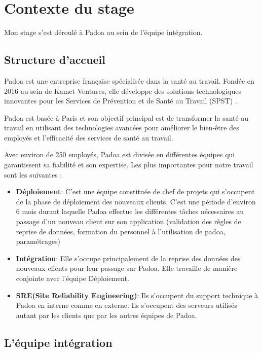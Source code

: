 \section{Contexte du stage}
Mon stage s'est déroulé à Padoa au sein de l'équipe intégration.

\subsection{Structure d'accueil}

Padoa est une entreprise française spécialisée dans la santé au travail. Fondée
en 2016 au sein de Kamet Ventures, elle développe des solutions technologiques
innovantes pour les Services de Prévention et de Santé au Travail (SPST)
\cite{padoa-website}.

Padoa est basée à Paris et son objectif principal est de transformer la santé
au travail en utilisant des technologies avancées pour améliorer le bien-être
des employés et l'efficacité des services de santé au travail.

Avec environ de 250 employés, Padoa est divisée en différentes équipes qui
garantissent sa fiabilité et son expertise. Les plus importantes pour notre
travail sont les suivantes :
\begin{itemize}

  \item \textbf{Déploiement}:
        C'est une équipe constituée de chef de projets qui s'occupent de la phase de déploiement des nouveaux clients. C'est une période d'environ 6 mois durant laquelle Padoa effectue les différentes tâches nécessaires au passage d'un nouveau client sur son application (validation des règles de reprise de données, formation du personnel à l'utilisation de padoa, paramétrages)

  \item \textbf{Intégration}:
        Elle s'occupe principalement de la reprise des données des nouveaux clients pour leur passage sur Padoa. Elle travaille de manière conjointe avec l'équipe Déploiement.

  \item \textbf{SRE(Site Reliability Engineering)}:
        Ils s'occupent du support technique à Padoa en interne comme en externe. Ils s'occupent des serveurs utilisés autant par les clients que par les autres équipes de Padoa.

\end{itemize}

\subsection{L'équipe intégration}

